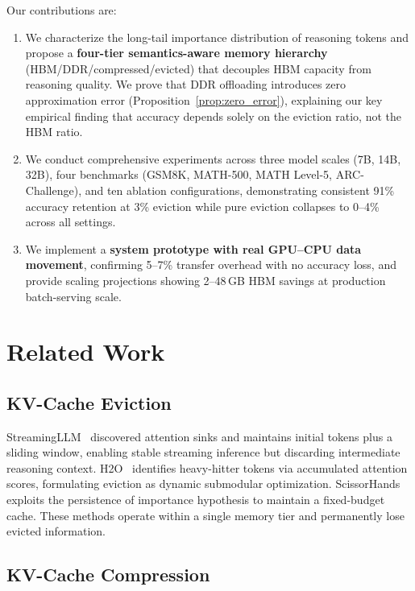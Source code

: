 \documentclass{article}
\begin{document}
Our contributions are:
\begin{enumerate}
    \item We characterize the long-tail importance distribution of reasoning tokens and propose a \textbf{four-tier semantics-aware memory hierarchy} (HBM/DDR/compressed/evicted) that decouples HBM capacity from reasoning quality.
    We prove that DDR offloading introduces zero approximation error (Proposition~\ref{prop:zero_error}), explaining our key empirical finding that accuracy depends solely on the eviction ratio, not the HBM ratio.
    \item We conduct comprehensive experiments across three model scales (7B, 14B, 32B), four benchmarks (GSM8K, MATH-500, MATH Level-5, ARC-Challenge), and ten ablation configurations, demonstrating consistent 91\% accuracy retention at 3\% eviction while pure eviction collapses to 0--4\% across all settings.
    \item We implement a \textbf{system prototype with real GPU--CPU data movement}, confirming 5--7\% transfer overhead with no accuracy loss, and provide scaling projections showing 2--48\,GB HBM savings at production batch-serving scale.
\end{enumerate}


\section{Related Work}
\label{sec:related}

\subsection{KV-Cache Eviction}

StreamingLLM~\cite{streamingllm} discovered attention sinks and maintains initial tokens plus a sliding window, enabling stable streaming inference but discarding intermediate reasoning context.
H2O~\cite{h2o} identifies heavy-hitter tokens via accumulated attention scores, formulating eviction as dynamic submodular optimization.
ScissorHands~\cite{scissorhands} exploits the persistence of importance hypothesis to maintain a fixed-budget cache.
These methods operate within a single memory tier and permanently lose evicted information.

\subsection{KV-Cache Compression}
\end{document}
